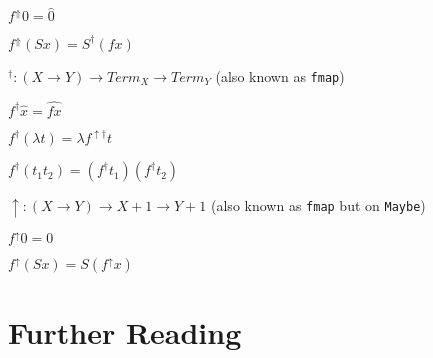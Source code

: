 $f^\Uparrow 0 = \widehat{0}$

$f^\Uparrow (S x) = S^\dagger(f x)$

\medskip

$^\dagger : (X \rightarrow Y) \rightarrow Term_X \rightarrow Term_Y$ (also known as \texttt{fmap})

$f^\dagger\widehat{x} = \widehat{f x}$

$f^\dagger(\lambda t) = \lambda f^{\uparrow\dagger}t$

$f^\dagger(t_1 t_2) = (f^\dagger t_1) (f^\dagger t_2)$

\medskip

$\uparrow : (X \rightarrow Y) \rightarrow X+1 \rightarrow Y+1$ (also known as \texttt{fmap} but on \texttt{Maybe})

$f^\uparrow 0 = 0$

$f^\uparrow (S x) = S(f^\uparrow x)$

\section{Further Reading}
